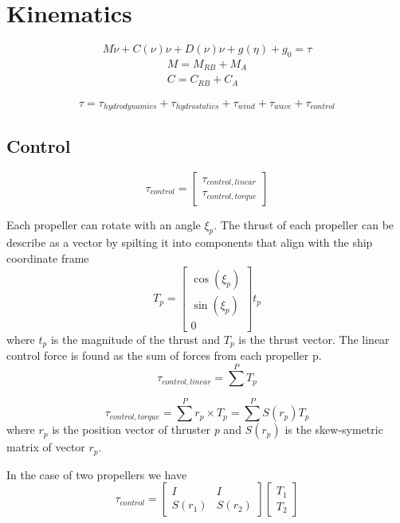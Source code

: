 \documentclass[12pt,a4]{article}
\begin{document}
\section{Kinematics}
\begin{equation}
	M \dot{\nu} + C(\nu)\nu + D(\nu)\nu + g(\eta) + g_0 = \tau
\end{equation}
\begin{align*}
	M  = M_{RB} + M_A \\
	C  = C_{RB} + C_A
\end{align*}

\begin{equation}
	\tau = \tau_{hydrodynamics}+\tau_{hydrostatics}+\tau_{wind}+\tau_{wave}+\tau_{control}
\end{equation}


\subsection{Control}
\begin{equation}
	\tau_{control} = \begin{bmatrix}
		\tau_{control,linear} \\
		\tau_{control,torque}
	\end{bmatrix}
\end{equation}

Each propeller can rotate with an angle $\xi_p$. The thrust of each propeller can be describe as a vector by spilting it into components that align with the ship coordinate frame
\begin{equation}
	T_p = \begin{bmatrix} \cos(\xi_p)\\ \sin(\xi_p)\\ 0 \end{bmatrix} t_p
\end{equation}
where $t_p$ is the magnitude of the thrust and $T_p$ is the thrust vector.
The linear control force is found as the sum of forces from each propeller p.
\begin{equation}
	\tau_{control,linear} = \sum^P T_p
\end{equation}

\begin{equation}
	\tau_{control,torque} = \sum^P  r_p \times T_p = \sum^P S(r_p) T_p
\end{equation}
where $r_p$ is the position vector of thruster \textit{p} and $S(r_p)$ is the skew-symetric matrix of vector $r_p$.

In the case of two propellers we have
\begin{equation}
	\tau_{control} = \begin{bmatrix} I & I \\ S(r_1) & S(r_2) \end{bmatrix}\begin{bmatrix} T_1 \\ T_2 \end{bmatrix}
\end{equation}
\end{document}
